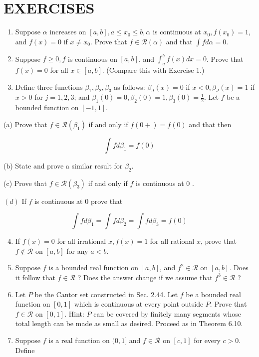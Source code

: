 \documentclass[10pt]{article}
\begin{document}
\section{EXERCISES}
\begin{enumerate}
  \item Suppose $\alpha$ increases on $[a, b], a \leq x_{0} \leq b, \alpha$ is continuous at $x_{0}, f\left(x_{0}\right)=1$, and $f(x)=0$ if $x \neq x_{0}$. Prove that $f \in \mathscr{R}(\alpha)$ and that $\int f d \alpha=0$.

  \item Suppose $f \geq 0, f$ is continuous on $[a, b]$, and $\int_{a}^{b} f(x) d x=0$. Prove that $f(x)=0$ for all $x \in[a, b]$. (Compare this with Exercise 1.)

  \item Define three functions $\beta_{1}, \beta_{2}, \beta_{3}$ as follows: $\beta_{J}(x)=0$ if $x<0, \beta_{J}(x)=1$ if $x>0$ for $j=1,2,3$; and $\beta_{1}(0)=0, \beta_{2}(0)=1, \beta_{3}(0)=\frac{1}{2}$. Let $f$ be a bounded function on $[-1,1]$.

\end{enumerate}

(a) Prove that $f \in \mathscr{R}\left(\beta_{1}\right)$ if and only if $f(0+)=f(0)$ and that then

$$
\int f d \beta_{1}=f(0)
$$

(b) State and prove a similar result for $\beta_{2}$.

(c) Prove that $f \in \mathscr{R}\left(\beta_{3}\right)$ if and only if $f$ is continuous at 0 .

$(d)$ If $f$ is continuous at 0 prove that

$$
\int f d \beta_{1}=\int f d \beta_{2}=\int f d \beta_{3}=f(0)
$$

\begin{enumerate}
  \setcounter{enumi}{3}
  \item If $f(x)=0$ for all irrational $x, f(x)=1$ for all rational $x$, prove that $f \notin \mathscr{R}$ on $[a, b]$ for any $a<b$.

  \item Suppose $f$ is a bounded real function on $[a, b]$, and $f^{2} \in \mathscr{R}$ on $[a, b]$. Does it follow that $f \in \mathscr{R}$ ? Does the answer change if we assume that $f^{3} \in \mathscr{R}$ ?

  \item Let $P$ be the Cantor set constructed in Sec. 2.44. Let $f$ be a bounded real function on $[0,1]$ which is continuous at every point outside $P$. Prove that $f \in \mathscr{R}$ on $[0,1]$. Hint: $P$ can be covered by finitely many segments whose total length can be made as small as desired. Proceed as in Theorem 6.10.

  \item Suppose $f$ is a real function on $(0,1]$ and $f \in \mathscr{R}$ on $[c, 1]$ for every $c>0$. Define

\end{enumerate}
\end{document}
